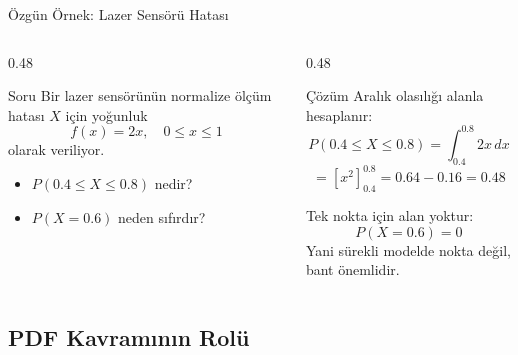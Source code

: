 \documentclass[light]{lutbeamer}
\begin{document}
\begin{frame}{Özgün Örnek: Lazer Sensörü Hatası}
\small
\begin{columns}[T,onlytextwidth]
    \begin{column}{0.48\textwidth}
        \begin{block}{Soru}
            Bir lazer sensörünün normalize ölçüm hatası $X$ için yoğunluk
            \[
            f(x)=2x, \quad 0 \le x \le 1
            \]
            olarak veriliyor.

            \vspace{0.15cm}
            \begin{itemize}
                \item $P(0.4 \le X \le 0.8)$ nedir?
                \item $P(X=0.6)$ neden sıfırdır?
            \end{itemize}
        \end{block}
    \end{column}
    \begin{column}{0.48\textwidth}
        \begin{exampleblock}{Çözüm}
            Aralık olasılığı alanla hesaplanır:
            \[
            P(0.4 \le X \le 0.8)=\int_{0.4}^{0.8} 2x\,dx
            \]
            \[
            =[x^2]_{0.4}^{0.8}=0.64-0.16=0.48
            \]

            \vspace{0.15cm}
            Tek nokta için alan yoktur:
            \[
            P(X=0.6)=0
            \]
            Yani sürekli modelde nokta değil, bant önemlidir.
        \end{exampleblock}
    \end{column}
\end{columns}
\end{frame}

\subsection{PDF Kavramının Rolü}
\end{document}
